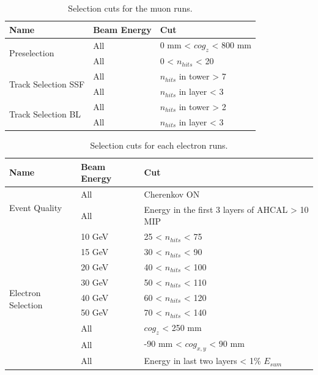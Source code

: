 \documentclass{JINST}
\begin{document}
\begin{table}[htb!]
	\centering
	\caption{Selection cuts for the muon runs.}
	\label{table:muon_sel}
	\begin{tabular}{@{}lll@{}}
		\toprule
		\multicolumn{1}{l}{\textbf{Name}} & \textbf{Beam Energy} & \textbf{Cut}\\
		\midrule
		\multirow{2}{*}{Preselection}& All & 0 mm < $cog_{z}$ < 800 mm\\& All & 0 < $n_{hits}$ < 20 \\
		\multirow{2}{*}{Track Selection SSF}& All & $n_{hits}$ in tower > 7 \\& All & $n_{hits}$ in layer < 3 \\
		\multirow{2}{*}{Track Selection BL}& All & $n_{hits}$ in tower > 2 \\& All & $n_{hits}$ in layer < 3 \\
		\bottomrule
	\end{tabular}
\end{table}

\begin{table}[htb!]
	\centering
	\caption{Selection cuts for each electron runs.}
	\label{table:electron_sel}
	\begin{tabular}{@{}lll@{}}
		\toprule
		\multicolumn{1}{l}{\textbf{Name}} & \textbf{Beam Energy} & \textbf{Cut}\\
		\midrule
		\multirow{2}{*}{Event Quality}& All & Cherenkov ON\\& All & Energy in the first 3 layers of AHCAL > 10 MIP \\
		\multirow{9}{*}{Electron Selection}& 10 GeV & 25 < $n_{hits}$ < 75 \\& 15 GeV & 30 < $n_{hits}$ < 90 \\& 20 GeV & 40 < $n_{hits}$ < 100 \\& 30 GeV & 50 < $n_{hits}$ < 110 \\& 40 GeV & 60 < $n_{hits}$ < 120 \\& 50 GeV & 70 < $n_{hits}$ < 140 \\& All & $cog_{z}$ < 250 mm\\& All & -90 mm < $cog_{x, y}$ < 90 mm \\& All & Energy in last two layers < 1\% $E_{sum}$ \\
		\bottomrule
	\end{tabular}
\end{table}
\end{document}
